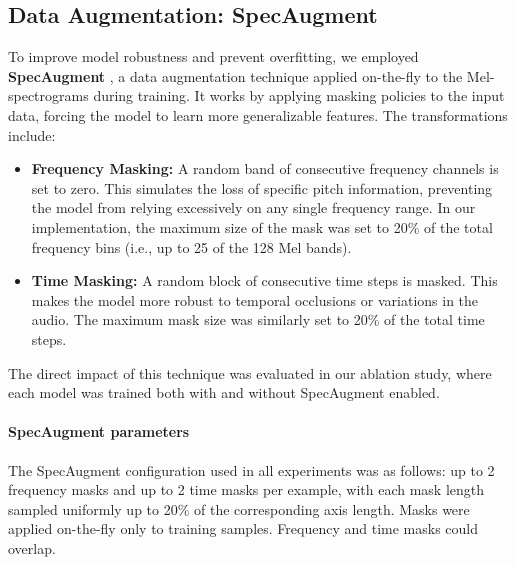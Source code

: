 \documentclass[11pt,a4paper]{article}
\begin{document}
\subsection{Data Augmentation: SpecAugment}
To improve model robustness and prevent overfitting, we employed \textbf{SpecAugment} \textbf{\cite{park2019specaugment}}, %
a data augmentation technique applied on-the-fly to the Mel-spectrograms during training. It works by applying masking policies to the input data, forcing the model to learn more generalizable features. The transformations include:
\begin{itemize}
    \item \textbf{Frequency Masking:} A random band of consecutive frequency channels is set to zero. This simulates the loss of specific pitch information, preventing the model from relying excessively on any single frequency range. In our implementation, the maximum size of the mask was set to 20\% of the total frequency bins (i.e., up to 25 of the 128 Mel bands).
    \item \textbf{Time Masking:} A random block of consecutive time steps is masked. This makes the model more robust to temporal occlusions or variations in the audio. The maximum mask size was similarly set to 20\% of the total time steps.
\end{itemize}
The direct impact of this technique was evaluated in our ablation study, where each model was trained both with and without SpecAugment enabled.

\paragraph{SpecAugment parameters}
The SpecAugment configuration used in all experiments was as follows: up to 2 frequency masks and up to 2 time masks per example, with each mask length sampled uniformly up to 20\% of the corresponding axis length. Masks were applied on-the-fly only to training samples. Frequency and time masks could overlap.
\end{document}
